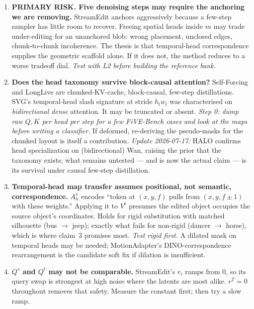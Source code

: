 \documentclass{article}
\begin{document}
\begin{enumerate}
  \item \textbf{PRIMARY RISK. Five denoising steps may require the anchoring we
        are removing.} StreamEdit anchors aggressively because a few-step sampler
        has little room to recover. Freeing spatial heads inside $m$ may trade
        under-editing for an unanchored blob: wrong placement, unclosed edges,
        chunk-to-chunk incoherence. The thesis is that temporal-head
        correspondence supplies the geometric scaffold alone. If it does not,
        the method reduces to a worse tradeoff dial. \emph{Test with L2 before
        building the reference bank.}
  \item \textbf{Does the head taxonomy survive block-causal attention?}
        Self-Forcing and LongLive are chunked-KV-cache, block-causal, few-step
        distillations. SVG's temporal-head slash signature at stride $h_l w_l$
        was characterised on \emph{bidirectional dense} attention. It may be
        truncated or absent. \emph{Step 0: dump raw $Q,K$ per head per step for
        a few FiVE-Bench cases and look at the maps before writing a
        classifier.} If deformed, re-deriving the pseudo-masks for the chunked
        layout is itself a contribution. \emph{Update 2026-07-17:} HALO confirms
        head specialization on (bidirectional) Wan, raising the prior that the
        taxonomy exists; what remains untested --- and is now the actual claim
        --- is its survival under causal few-step distillation.
  \item \textbf{Temporal-head map transfer assumes positional, not semantic,
        correspondence.} $A^{s}_h$ encodes ``token at $(x,y,f)$ pulls from
        $(x,y,f\pm 1)$ with these weights.'' Applying it to $V^{t}$ presumes the
        edited object occupies the source object's coordinates. Holds for rigid
        substitution with matched silhouette (bus $\to$ jeep); exactly what fails
        for non-rigid (dancer $\to$ horse), which is where claim~3 promises most.
        \emph{Test rigid first.} A dilated mask on temporal heads may be
        needed; MotionAdapter's DINO-correspondence rearrangement is the
        candidate soft fix if dilation is insufficient.
  \item \textbf{$Q^{s}$ and $Q^{t}$ may not be comparable.} StreamEdit's $r_i$
        ramps from $0$, so its query swap is strongest at high noise where the
        latents are most alike. $r^{T}=0$ throughout removes that safety. Measure
        the constant first; then try a slow ramp.

\end{enumerate}
\end{document}
